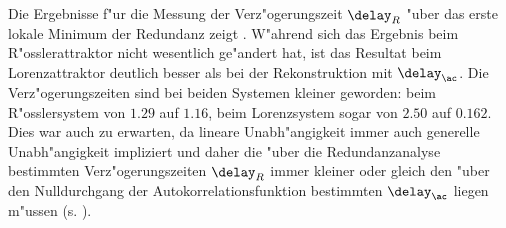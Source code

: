 Die Ergebnisse f"ur die Messung der Verz"ogerungszeit $\delay_R$ "uber das erste lokale
Minimum der Redundanz zeigt . W"ahrend sich das Ergebnis beim
R"osslerattraktor nicht wesentlich ge"andert hat, ist das Resultat beim Lorenzattraktor
deutlich besser als bei der Rekonstruktion mit $\delay_\ac$. Die Verz"ogerungszeiten sind
bei beiden Systemen kleiner geworden: beim R"osslersystem von $1.29$ auf $1.16$, beim
Lorenzsystem sogar von $2.50$ auf $0.162$.  Dies war auch zu erwarten, da lineare
Unabh"angigkeit immer auch generelle Unabh"angigkeit impliziert und daher die "uber die
Redundanzanalyse bestimmten Verz"ogerungszeiten $\delay_R$ immer kleiner oder gleich den
"uber den Nulldurchgang der Autokorrelationsfunktion bestimmten $\delay_\ac$ liegen
m"ussen (s. ).


 












